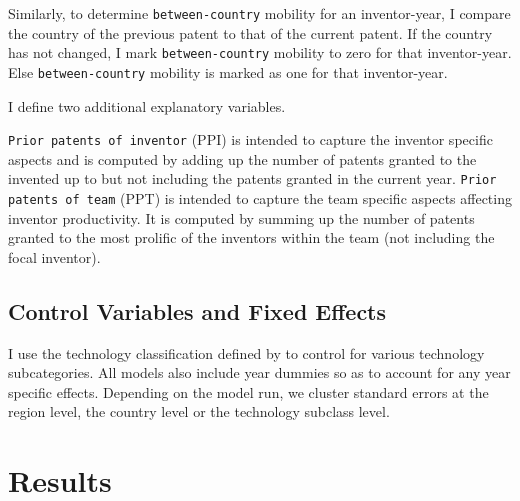 \documentclass[12pt]{article}
\begin{document}
Similarly, to determine \texttt{between-country} mobility for an inventor-year,  I  compare the country  of the previous patent to that of the current patent. If the country has not changed, I mark \texttt{between-country} mobility to zero for that inventor-year. Else \texttt{between-country} mobility is marked as one for that inventor-year.\par

I define two additional explanatory variables. \par
\texttt{Prior patents of inventor} (PPI) is intended to capture the inventor specific aspects and is computed by adding up the number of patents granted to the invented up to but not including the patents granted in the current year. \texttt{Prior patents of team} (PPT) is intended to capture the team specific aspects affecting inventor productivity. It is computed by summing up the number of patents granted to the most prolific of the inventors within the team (not including the focal inventor).

\subsection{Control Variables and Fixed Effects}
I use the technology classification defined by  \cite{Hall2001} to control for various technology subcategories. All models also include  year dummies so as to account for any year specific effects. Depending on the model run, we cluster standard errors at the region level, the country level or the technology subclass level.
\newpage
\section{Results}
\singlespacing

\newpage


\begin{landscape}

\end{landscape}


\newpage

\newpage


\newpage


\newpage

\end{document}
